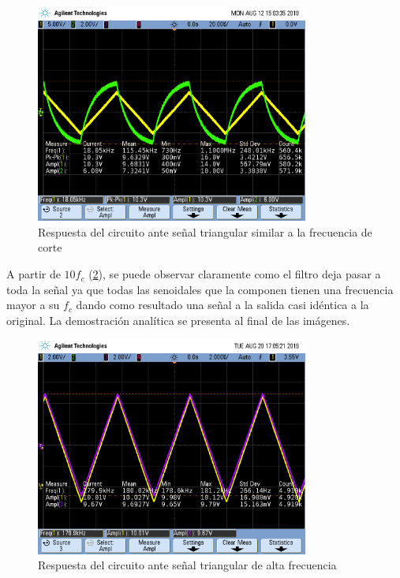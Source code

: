 \documentclass[11pt, a4paper]{article}
\begin{document}
\begin{figure}[H]
	\centering
	\includegraphics[width=0.8\textwidth,trim={0.5cm 5cm  1 5cm},clip]{rta_onda_triang_fc2.png}
	\caption{Respuesta del circuito ante señal triangular similar a la frecuencia de corte} 
	\label{graf:rta_onda_triang_fc}
\end{figure}

A partir de $10f_c$ (\ref{graf:rta_onda_triang_alta_f}), se puede observar claramente como el filtro deja pasar a toda la señal ya que todas las senoidales que la componen tienen una frecuencia mayor a su $f_c$ dando como resultado una señal a la salida casi idéntica a la original.
La demostración analítica se presenta al final de las imágenes.

\begin{figure}[H]
	\centering
	\includegraphics[width=0.8\textwidth,trim={0.5cm 5cm  1 5cm},clip]{rta_onda_triang_alta_f.png}
	\caption{Respuesta del circuito ante señal triangular de alta frecuencia} 
	\label{graf:rta_onda_triang_alta_f}
\end{figure}
\end{document}
